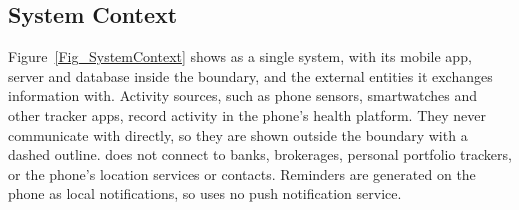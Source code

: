 \documentclass[12pt]{article}
\begin{document}
\subsection{System Context}


Figure~\ref{Fig_SystemContext} shows \progname{} as a single system, with its
mobile app, server and database inside the boundary, and the external entities
it exchanges information with. Activity sources, such as phone sensors,
smartwatches and other tracker apps, record activity in the phone's health
platform. They never communicate with \progname{} directly, so they are shown
outside the boundary with a dashed outline. \progname{} does not connect to
banks, brokerages, personal portfolio trackers, or the phone's location
services or contacts.
Reminders are generated on the phone as local notifications, so \progname{}
uses no push notification service.
\end{document}
